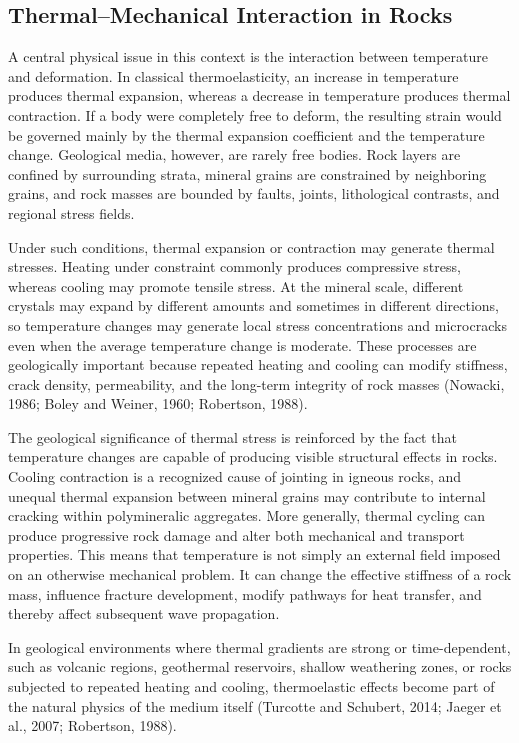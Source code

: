 \documentclass[12pt]{article}
\begin{document}
\subsection{Thermal--Mechanical Interaction in Rocks}

A central physical issue in this context is the interaction between temperature and deformation. In classical thermoelasticity, an increase in temperature produces thermal expansion, whereas a decrease in temperature produces thermal contraction. If a body were completely free to deform, the resulting strain would be governed mainly by the thermal expansion coefficient and the temperature change. Geological media, however, are rarely free bodies. Rock layers are confined by surrounding strata, mineral grains are constrained by neighboring grains, and rock masses are bounded by faults, joints, lithological contrasts, and regional stress fields.

Under such conditions, thermal expansion or contraction may generate thermal stresses. Heating under constraint commonly produces compressive stress, whereas cooling may promote tensile stress. At the mineral scale, different crystals may expand by different amounts and sometimes in different directions, so temperature changes may generate local stress concentrations and microcracks even when the average temperature change is moderate. These processes are geologically important because repeated heating and cooling can modify stiffness, crack density, permeability, and the long-term integrity of rock masses (Nowacki, 1986; Boley and Weiner, 1960; Robertson, 1988).

The geological significance of thermal stress is reinforced by the fact that temperature changes are capable of producing visible structural effects in rocks. Cooling contraction is a recognized cause of jointing in igneous rocks, and unequal thermal expansion between mineral grains may contribute to internal cracking within polymineralic aggregates. More generally, thermal cycling can produce progressive rock damage and alter both mechanical and transport properties. This means that temperature is not simply an external field imposed on an otherwise mechanical problem. It can change the effective stiffness of a rock mass, influence fracture development, modify pathways for heat transfer, and thereby affect subsequent wave propagation.

In geological environments where thermal gradients are strong or time-dependent, such as volcanic regions, geothermal reservoirs, shallow weathering zones, or rocks subjected to repeated heating and cooling, thermoelastic effects become part of the natural physics of the medium itself (Turcotte and Schubert, 2014; Jaeger et al., 2007; Robertson, 1988).
\end{document}
